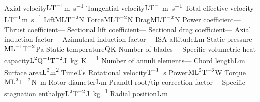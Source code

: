   {Axial velocity}{\( \textrm{L}\textrm{T}^{-1} \)}{\si{\meter\per\second}}
  {Tangential velocity}{\( \textrm{L}\textrm{T}^{-1} \)}{\si{\meter\per\second}} 
  {Total effective velocity}{\( \textrm{L}\textrm{T}^{-1} \)}{\si{\meter\per\second}}
      {Lift}{\( \textrm{M}\textrm{L}\textrm{T}^{-2} \)}{\si{\newton}}
      {Force}{\( \textrm{M}\textrm{L}\textrm{T}^{-2} \)}{\si{\newton}}
      {Drag}{\( \textrm{M}\textrm{L}\textrm{T}^{-2} \)}{\si{\newton}}
    {Power coefficient}{--}{--}
    {Thrust coefficient}{--}{--}
    {Sectional lift coefficient}{--}{--}
    {Sectional drag coefficient}{--}{--}
      {Axial induction factor}{--}{--}
     {Azimuthal induction factor}{--}{--}
      {ISA altitude}{\( \textrm{L} \)}{\si{\meter}}
      {Static pressure}{\( \textrm{M}\textrm{L}^{-1}\textrm{T}^{-2} \)}{\si{\pascal}}
      {Static temperature}{\( \textrm{Q} \)}{\si{\kelvin}}
    {Number of blades}{--}{--}
    {Specific volumetric heat capacity}{\( \textrm{L}^2\textrm{Q}^{-1}\textrm{T}^{-2} \)}{\si{\joule\per\kilogram\per \kelvin}}
    {Number of annuli elements}{--}{--}
      {Chord length}{\( \textrm{L} \)}{\si{\meter}} 
      {Surface area}{\( \textrm{L}^2 \)}{\si{\meter\squared}}
      {Time}{\( \textrm{T} \)}{\si{\second}}
      {Rotational velocity}{\( \textrm{T}^{-1} \)}{\si{\per\second}}
      {Power}{\( \textrm{M}\textrm{L}^2\textrm{T}^{-3} \)}{\si{\watt}}
      {Torque}{\( \textrm{M}\textrm{L}^2\textrm{T}^{-2} \)}{\si{\newton\meter}} 
      {Rotor diameter}{\( \textrm{L} \)}{\si{\meter}}
      {Prandtl root/tip correction factor}{--}{--}
      {Specific stagnation enthalpy}{\( \textrm{L}^{2}\textrm{T}^{-2} \)}{\si{\joule\per\kilogram}}
      {Radial position}{\( \textrm{L} \)}{\si{\meter}} 
\nomtypeR[ZZZ]{}{}{}{} %

\nomtypeS[ZZZ]{}{} %

\nomtypeU[ZZZ]{}{} %

\printnomenclature[6em] %
\newpage